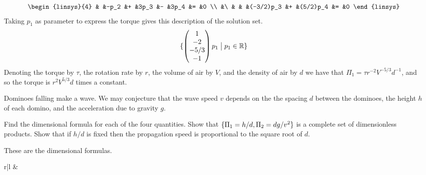 \begin{exercises}
\begin{answer}
\begin{exparts}
\begin{equation*}
\begin{linsys}{4}
                    &   &-p_2  &+  &3p_3       &-   &3p_4      &=  &0  \\
                    &\  &      &   &(-3/2)p_3  &+   &(5/2)p_4  &=  &0  
            \end{linsys}
          \end{equation*}
          Taking $p_1$ as parameter to express the torque gives this
          description of the solution set.
          \begin{equation*}
            \mbox{$\{\begin{pmatrix} 1 \\ -2 \\ -5/3 \\ -1 \end{pmatrix}p_1
                 \bigm| p_1\in\mathbb{R}\}$}
          \end{equation*}
          Denoting the torque by $\tau$, the rotation rate by $r$, the volume
          of air by $V$, and the density of air by $d$ we have that
          $\Pi_1=\tau r^{-2} V^{-5/3} d^{-1}$, and so
          the torque is $r^2V^{5/3}d$ times a constant.
      \end{exparts}
    \end{answer}
  \item 
    Dominoes falling make a wave. 
    We may conjecture that the wave speed $v$ depends on the
    the spacing $d$ between the dominoes,
    the height $h$ of each domino, 
    and the acceleration due to gravity $g$.
    \cite{Tilley} 
    \begin{exparts}
      \partsitem Find the dimensional formula for each of the four quantities.
      \partsitem Show that $\mbox{$\{\Pi_1=h/d,\Pi_2=dg/v^2\}$}$ 
        is a complete set of dimensionless products.
      \partsitem Show that if $h/d$ is fixed then
        the propagation speed is proportional to the square root
        of $d$.
    \end{exparts}
    \begin{answer}
          \begin{exparts}
            \partsitem These are the dimensional formulas.
              \begin{center}
                \begin{tabular}{r|l} 
                    & \\ \hline

\end{tabular}
\end{center}
\end{exparts}
\end{answer}
\end{exercises}
